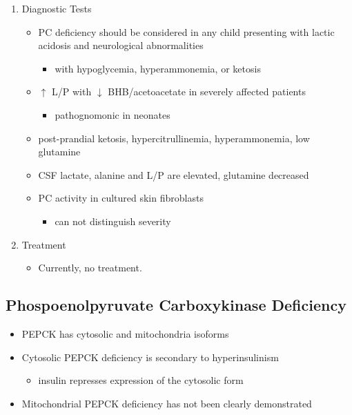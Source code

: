 \documentclass{scrartcl}
\begin{document}
\begin{enumerate}
\item Diagnostic Tests
\label{sec:org141d6b4}
\begin{itemize}
\item PC deficiency should be considered in any child presenting with
lactic acidosis and neurological abnormalities
\begin{itemize}
\item with hypoglycemia, hyperammonemia, or ketosis
\end{itemize}

\item \(\uparrow\) L/P with \(\downarrow\) BHB/acetoacetate in severely affected patients
\begin{itemize}
\item pathognomonic in neonates
\end{itemize}

\item post-prandial ketosis, hypercitrullinemia, hyperammonemia, low glutamine

\item CSF lactate, alanine and L/P are elevated, glutamine decreased

\item PC activity in cultured skin fibroblasts
\begin{itemize}
\item can not distinguish severity
\end{itemize}
\end{itemize}

\item Treatment
\label{sec:org39f567e}

\begin{itemize}
\item Currently, no treatment.
\end{itemize}
\end{enumerate}

\subsection{Phospoenolpyruvate Carboxykinase Deficiency}
\label{sec:org562821d}
\begin{itemize}
\item PEPCK has cytosolic and mitochondria isoforms
\item Cytosolic PEPCK deficiency is secondary to hyperinsulinism
\begin{itemize}
\item insulin represses expression of the cytosolic form
\end{itemize}
\item Mitochondrial PEPCK deficiency has not been clearly demonstrated
\end{itemize}
\end{document}

